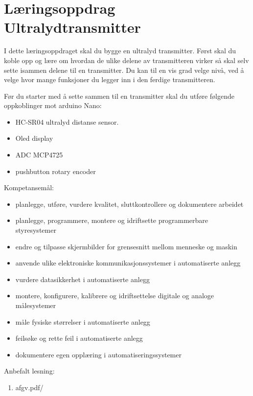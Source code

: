 
\noindent
\section*{Læringsoppdrag Ultralydtransmitter}

\vskip 5pt
I dette læringsoppdraget skal du bygge en ultralyd transmitter. Først skal du koble opp og lære om hvordan de ulike delene av transmitteren virker så skal selv sette isammen delene til en transmitter. Du kan til en vis grad velge nivå, ved å velge hvor mange funksjoner du legger inn i den ferdige transmitteren. 

Før du  starter med å sette sammen til en transmitter skal du utføre følgende oppkoblinger mot arduino Nano:
\begin{itemize}[noitemsep]
	\item HC-SR04 ultralyd distanse sensor. 
	\item Oled display
	\item ADC MCP4725
	\item pushbutton rotary encoder
\end{itemize}


\vskip 2.5pt 
Kompetansemål:
\begin{itemize}[noitemsep]

	\item planlegge, utføre, vurdere kvalitet, sluttkontrollere og dokumentere arbeidet
	\item planlegge, programmere, montere og idriftsette programmerbare styresystemer
	\item endre og tilpasse skjermbilder for grensesnitt mellom menneske og maskin
	\item anvende ulike elektroniske kommunikasjonssystemer i automatiserte anlegg
	\item vurdere datasikkerhet i automatiserte anlegg
	\item montere, konfigurere, kalibrere og idriftsettelse digitale og analoge målesystemer
	\item måle fysiske størrelser i automatiserte anlegg
	\item feilsøke og rette feil i automatiserte anlegg
	\item dokumentere egen opplæring i automatiseringssystemer
\end{itemize}

Anbefalt lesning:

\begin{enumerate}
	\item afgv.pdf/ 
\end{enumerate}

